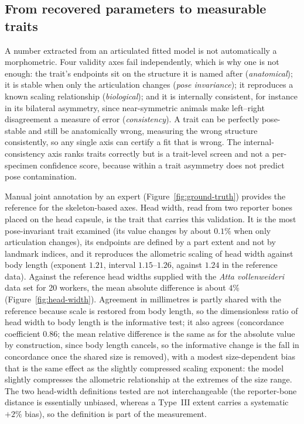 \subsection{From recovered parameters to measurable traits}
\label{sec:measurement}

A number extracted from an articulated fitted model is not automatically a
morphometric. Four validity axes fail independently, which is why one is not enough: the
trait's endpoints sit on the structure it is named after (\emph{anatomical}); it is stable
when only the articulation changes (\emph{pose invariance}); it reproduces a known scaling
relationship (\emph{biological}); and it is internally consistent, for instance in its
bilateral asymmetry, since near-symmetric animals make left--right disagreement a
measure of error (\emph{consistency}). A trait can be perfectly pose-stable and still be
anatomically wrong, measuring the wrong structure consistently, so any single axis can
certify a fit that is wrong. The internal-consistency axis ranks traits correctly but is a
trait-level screen and not a per-specimen confidence score, because within a trait
asymmetry does not predict pose contamination.

Manual joint annotation by an expert (Figure~\ref{fig:ground-truth}) provides the reference
for the skeleton-based axes. Head width, read from two reporter bones placed on the head
capsule, is the trait that carries this validation. It is the most pose-invariant trait examined (its value changes by
about $0.1\%$ when only articulation changes), its endpoints are defined by a part extent
and not by landmark indices, and it reproduces the allometric scaling of head width against
body length (exponent $1.21$, interval $1.15$--$1.26$, against $1.24$ in the reference
data). Against the reference head widths supplied with the \emph{Atta vollenweideri} data
set for 20 workers, the mean absolute difference is about $4\%$
(Figure~\ref{fig:head-width}). Agreement in millimetres is partly shared with the
reference because scale is restored from body length, so the dimensionless ratio of head
width to body length is the informative test; it also agrees (concordance coefficient
$0.86$; the mean relative difference is the same as for the absolute value by
construction, since body length cancels, so the informative change is the fall in
concordance once the shared size is removed), with a modest size-dependent bias that is the same effect as the slightly
compressed scaling exponent: the model slightly compresses the allometric relationship at
the extremes of the size range. The two head-width definitions tested are not
interchangeable (the reporter-bone distance is essentially unbiased, whereas a
Type~III extent carries a systematic $+2\%$ bias), so the definition is part of the
measurement.

